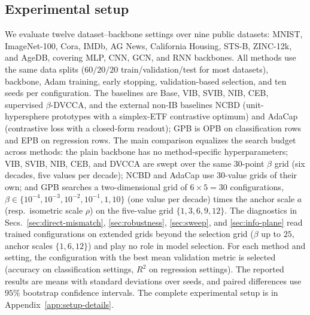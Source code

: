 \subsection{Experimental setup}
\label{sec:setup}
We evaluate twelve dataset--backbone settings over nine public datasets:
MNIST, ImageNet-100, Cora, IMDb, AG News, California Housing, STS-B,
ZINC-12k, and AgeDB, covering MLP, CNN, GCN, and RNN backbones. All
methods use the same data splits ($60/20/20$ train/validation/test for
most datasets), backbone, Adam training, early stopping,
validation-based selection, and ten seeds per configuration. The baselines are Base, VIB,
SVIB, NIB, CEB, supervised $\beta$-DVCCA, and the external non-IB
baselines NCBD (unit-hypersphere prototypes with a simplex-ETF
contrastive optimum) and AdaCap (contrastive loss with a closed-form
readout); GPB is OPB on classification rows and EPB on
regression rows. The main comparison equalizes the search budget across methods: the plain
backbone has no method-specific hyperparameters; VIB, SVIB, NIB, CEB, and
DVCCA are swept over the same 30-point $\beta$ grid (six decades, five
values per decade); NCBD and AdaCap use 30-value grids of their own; and
GPB searches a two-dimensional grid of $6\times5=30$ configurations,
$\beta\in\{10^{-4},10^{-3},10^{-2},10^{-1},1,10\}$ (one value per decade)
times the anchor scale $a$ (resp.\ isometric scale $\rho$) on the
five-value grid $\{1,3,6,9,12\}$. The diagnostics in
Secs.~\ref{sec:direct-mismatch}, \ref{sec:robustness}, \ref{sec:sweep},
and \ref{sec:info-plane} read trained configurations on extended grids
beyond the selection grid ($\beta$ up to $25$, anchor scales
$\{1,6,12\}$) and play no role in model selection. For each method and setting,
the configuration with the best mean validation metric is selected
(accuracy on classification settings, $R^2$ on regression settings). The
reported results are means with standard deviations over seeds, and
paired differences use $95\%$ bootstrap confidence intervals. The complete
experimental setup is in Appendix~\ref{app:setup-details}.


